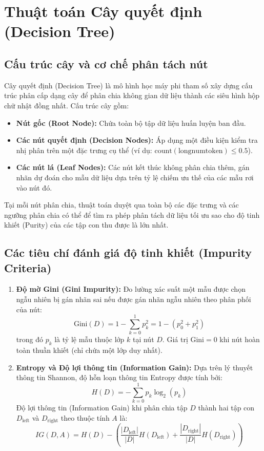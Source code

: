 \section{Thuật toán Cây quyết định (Decision Tree)}
\label{sec:decision-tree-ly-thuyet}

\subsection{Cấu trúc cây và cơ chế phân tách nút}
Cây quyết định (Decision Tree) là mô hình học máy phi tham số xây dựng cấu trúc phân cấp dạng cây để phân chia không gian dữ liệu thành các siêu hình hộp chữ nhật đồng nhất.
Cấu trúc cây gồm:
\begin{itemize}
    \item \textbf{Nút gốc (Root Node):} Chứa toàn bộ tập dữ liệu huấn luyện ban đầu.
    \item \textbf{Các nút quyết định (Decision Nodes):} Áp dụng một điều kiện kiểm tra nhị phân trên một đặc trưng cụ thể (ví dụ: $\text{count}(\text{longnumtoken}) \le 0.5$).
    \item \textbf{Các nút lá (Leaf Nodes):} Các nút kết thúc không phân chia thêm, gán nhãn dự đoán cho mẫu dữ liệu dựa trên tỷ lệ chiếm ưu thế của các mẫu rơi vào nút đó.
\end{itemize}

Tại mỗi nút phân chia, thuật toán duyệt qua toàn bộ các đặc trưng và các ngưỡng phân chia có thể để tìm ra phép phân tách dữ liệu tối ưu sao cho độ tinh khiết (Purity) của các tập con thu được là lớn nhất.

\subsection{Các tiêu chí đánh giá độ tinh khiết (Impurity Criteria)}
\begin{enumerate}
    \item \textbf{Độ mờ Gini (Gini Impurity):}
    Đo lường xác suất một mẫu được chọn ngẫu nhiên bị gán nhãn sai nếu được gán nhãn ngẫu nhiên theo phân phối của nút:
    \begin{equation}
    \text{Gini}(D) = 1 - \sum_{k=0}^1 p_k^2 = 1 - (p_0^2 + p_1^2)
    \end{equation}
    trong đó $p_k$ là tỷ lệ mẫu thuộc lớp $k$ tại nút $D$. Giá trị $\text{Gini} = 0$ khi nút hoàn toàn thuần khiết (chỉ chứa một lớp duy nhất).
    \item \textbf{Entropy và Độ lợi thông tin (Information Gain):}
    Dựa trên lý thuyết thông tin Shannon, độ hỗn loạn thông tin Entropy được tính bởi:
    \begin{equation}
    H(D) = -\sum_{k=0}^1 p_k \log_2(p_k)
    \end{equation}
    Độ lợi thông tin (Information Gain) khi phân chia tập $D$ thành hai tập con $D_{\text{left}}$ và $D_{\text{right}}$ theo thuộc tính $A$ là:
    \begin{equation}
    IG(D, A) = H(D) - \left( \frac{|D_{\text{left}}|}{|D|} H(D_{\text{left}}) + \frac{|D_{\text{right}}|}{|D|} H(D_{\text{right}}) \right)
    \end{equation}
\end{enumerate}

